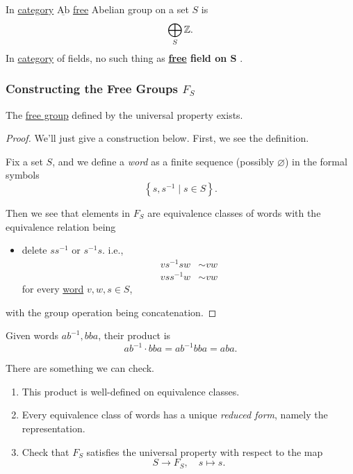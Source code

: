 \begin{eg}
	In \hyperref[def:category,object,morphism]{category} \(\underline{\mathrm{Ab}}\) \hyperref[def:free-group]{free} Abelian group on a set \(S\) is
	\[
		\bigoplus_S \mathbb{\MakeUppercase{z}}.
	\]
	In \hyperref[def:category,object,morphism]{category} of fields, no such thing as \textbf{\hyperref[def:free-group]{free} field on \(\bm{S} \) }.
\end{eg}

\subsubsection{Constructing the Free Groups \(F_S\)}
\begin{proposition}
	The \hyperref[def:free-group]{free group} defined by the universal property exists.
\end{proposition}
\begin{proof}
	We'll just give a construction below. First, we see the definition.
	\begin{definition}\label{def:word}
		Fix a set \(S\), and we define a \emph{word} as a finite sequence (possibly \(\varnothing \))
		in the formal symbols
		\[
			\left\{s, s ^{-1} \mid s\in S\right\}.
		\]
	\end{definition}

	Then we see that elements in \(F_S\) are equivalence classes of words with the equivalence relation being
	\begin{itemize}
		\item delete \(s s ^{-1} \) or \(s ^{-1} s\). i.e.,
		      \[
			      \begin{split}
				      vs ^{-1} s w&\sim vw\\
				      v s s ^{-1}  w &\sim vw
			      \end{split}
		      \]
		      for every \hyperref[def:word]{word} \(v, w, s\in S\),
	\end{itemize}
	with the group operation being concatenation.
\end{proof}

\begin{eg}
	Given words \(ab^{-1} , bba\), their product is
	\[
		ab^{-1} \cdot bba = ab^{-1}  bb a = aba.
	\]
\end{eg}

\begin{exercise}
	There are something we can check.
	\begin{enumerate}
		\item This product is well-defined on equivalence classes.
		\item Every equivalence class of words has a unique \emph{reduced form}, namely the representation.
		\item Check that \(F_S\) satisfies the universal property with respect to the map
		      \[
			      S\to F_S,\quad s\mapsto s.
		      \]
	\end{enumerate}
\end{exercise}

